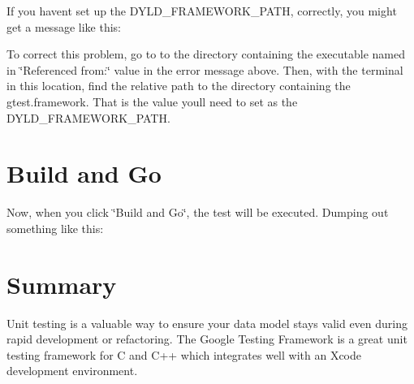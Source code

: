 If you haven\textquotesingle{}t set up the D\+Y\+L\+D\+\_\+\+F\+R\+A\+M\+E\+W\+O\+R\+K\+\_\+\+P\+A\+TH, correctly, you might get a message like this\+:


\begin{DoxyCode}{0}
\end{DoxyCode}


To correct this problem, go to to the directory containing the executable named in \char`\"{}\+Referenced from\+:\char`\"{} value in the error message above. Then, with the terminal in this location, find the relative path to the directory containing the gtest.\+framework. That is the value you\textquotesingle{}ll need to set as the D\+Y\+L\+D\+\_\+\+F\+R\+A\+M\+E\+W\+O\+R\+K\+\_\+\+P\+A\+TH.

\section*{Build and Go}

Now, when you click \char`\"{}\+Build and Go\char`\"{}, the test will be executed. Dumping out something like this\+:


\begin{DoxyCode}{0}
\DoxyCodeLine{}
\end{DoxyCode}


\section*{Summary}

Unit testing is a valuable way to ensure your data model stays valid even during rapid development or refactoring. The Google Testing Framework is a great unit testing framework for C and C++ which integrates well with an Xcode development environment. 
